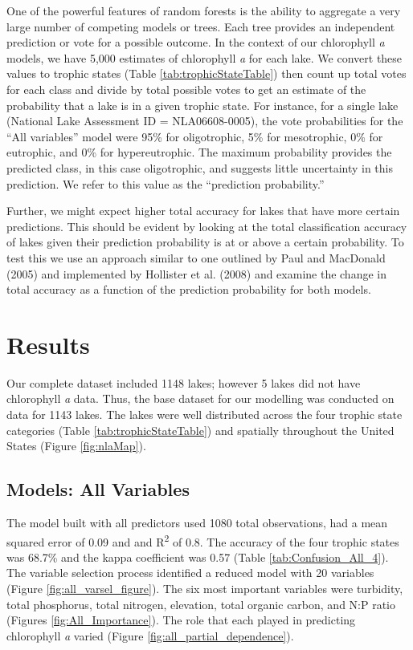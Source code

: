 \documentclass[12pt,]{article}
\begin{document}
One of the powerful features of random forests is the ability to
aggregate a very large number of competing models or trees. Each tree
provides an independent prediction or vote for a possible outcome. In
the context of our chlorophyll \emph{a} models, we have 5,000 estimates
of chlorophyll \emph{a} for each lake. We convert these values to
trophic states (Table \ref {tab:trophicStateTable}) then count up total
votes for each class and divide by total possible votes to get an
estimate of the probability that a lake is in a given trophic state. For
instance, for a single lake (National Lake Assessment ID =
NLA06608-0005), the vote probabilities for the ``All variables'' model
were 95\% for oligotrophic, 5\% for mesotrophic, 0\% for eutrophic, and
0\% for hypereutrophic. The maximum probability provides the predicted
class, in this case oligotrophic, and suggests little uncertainty in
this prediction. We refer to this value as the ``prediction
probability.''

Further, we might expect higher total accuracy for lakes that have more
certain predictions. This should be evident by looking at the total
classification accuracy of lakes given their prediction probability is
at or above a certain probability. To test this we use an approach
similar to one outlined by Paul and MacDonald (2005) and implemented by
Hollister et al. (2008) and examine the change in total accuracy as a
function of the prediction probability for both models.

\section{Results}\label{results}

Our complete dataset included 1148 lakes; however 5 lakes did not have
chlorophyll \emph{a} data. Thus, the base dataset for our modelling was
conducted on data for 1143 lakes. The lakes were well distributed across
the four trophic state categories (Table \ref{tab:trophicStateTable})
and spatially throughout the United States (Figure \ref{fig:nlaMap}).

\subsection{Models: All Variables}\label{models-all-variables}

The model built with all predictors used 1080 total observations, had a
mean squared error of 0.09 and and R\textsuperscript{2} of 0.8. The
accuracy of the four trophic states was 68.7\% and the kappa coefficient
was 0.57 (Table \ref{tab:Confusion_All_4}). The variable selection
process identified a reduced model with 20 variables (Figure
\ref{fig:all_varsel_figure}). The six most important variables were
turbidity, total phosphorus, total nitrogen, elevation, total organic
carbon, and N:P ratio (Figures \ref{fig:All_Importance}). The role that
each played in predicting chlorophyll \emph{a} varied (Figure
\ref{fig:all_partial_dependence}).
\end{document}

